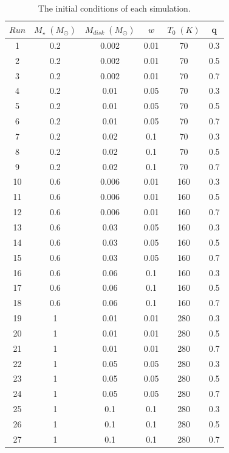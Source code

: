 \documentclass[aps,prb,twocolumn,superscriptaddress,floatfix,longbibliography]{revtex4-2}
\begin{document}
\begin{table}[!htbp]
  \centering
  \begin{tabular}{cccccc}
  \hline
  $Run$ & $M_{\star} \; (M_{\odot})$ & $M_{disk} \; (M_{\odot})$ & $w$ & $T_0 \; (K)$ & q \\
  \hline \hline
  1 & 0.2 & 0.002 & 0.01 & 70 & 0.3 \\
  2 & 0.2 & 0.002 & 0.01 & 70 & 0.5 \\
  3 & 0.2 & 0.002 & 0.01 & 70 & 0.7 \\
  \hline
  4 & 0.2 & 0.01 & 0.05 & 70 & 0.3 \\
  5 & 0.2 & 0.01 & 0.05 & 70 & 0.5 \\
  6 & 0.2 & 0.01 & 0.05 & 70 & 0.7 \\
  \hline
  7 & 0.2 & 0.02 & 0.1 & 70 & 0.3 \\
  8 & 0.2 & 0.02 & 0.1 & 70 & 0.5 \\
  9 & 0.2 & 0.02 & 0.1 & 70 & 0.7 \\
  \hline
  10 & 0.6 & 0.006 & 0.01 & 160 & 0.3 \\
  11 & 0.6 & 0.006 & 0.01 & 160 & 0.5 \\
  12 & 0.6 & 0.006 & 0.01 & 160 & 0.7 \\
  \hline
  13 & 0.6 & 0.03 & 0.05 & 160 & 0.3 \\
  14 & 0.6 & 0.03 & 0.05 & 160 & 0.5 \\
  15 & 0.6 & 0.03 & 0.05 & 160 & 0.7 \\
  \hline
  16 & 0.6 & 0.06 & 0.1 & 160 & 0.3 \\
  17 & 0.6 & 0.06 & 0.1 & 160 & 0.5 \\
  18 & 0.6 & 0.06 & 0.1 & 160 & 0.7 \\
  \hline
  19 & 1 & 0.01 & 0.01 & 280 & 0.3 \\
  20 & 1 & 0.01 & 0.01 & 280 & 0.5 \\
  21 & 1 & 0.01 & 0.01 & 280 & 0.7 \\
  \hline
  22 & 1 & 0.05 & 0.05 & 280 & 0.3 \\
  23 & 1 & 0.05 & 0.05 & 280 & 0.5 \\
  24 & 1 & 0.05 & 0.05 & 280 & 0.7 \\
  \hline
  25 & 1 & 0.1 & 0.1 & 280 & 0.3 \\
  26 & 1 & 0.1 & 0.1 & 280 & 0.5 \\
  27 & 1 & 0.1 & 0.1 & 280 & 0.7 \\
  \hline
  \end{tabular}
\caption{The initial conditions of each simulation.}\label{tab:initial conditions}
\end{table}
\end{document}
